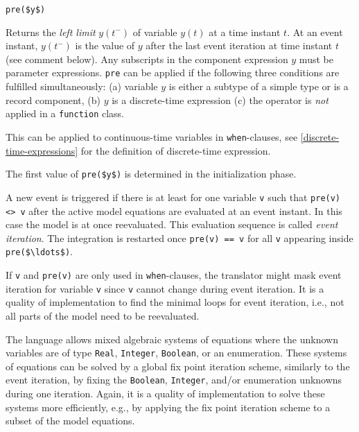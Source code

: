 \begin{operatordefinition}[pre]
\begin{synopsis}\begin{lstlisting}
pre($y$)
\end{lstlisting}\end{synopsis}
\begin{semantics}
Returns the \emph{left limit} $y(t^{-})$ of variable $y(t)$ at a time instant $t$.
At an event instant, $y(t^{-})$ is the value of $y$ after the last event iteration at time instant $t$ (see comment below).
Any subscripts in the component expression $y$ must be parameter expressions.
\lstinline!pre! can be applied if the following three conditions are fulfilled simultaneously: (a) variable $y$ is either a subtype of a simple type or is a record component, (b) $y$ is a discrete-time expression (c) the operator is \emph{not} applied in a \lstinline!function! class.
\begin{nonnormative}
This can be applied to continuous-time variables in \lstinline!when!-clauses, see \cref{discrete-time-expressions} for the definition of discrete-time expression.
\end{nonnormative}
The first value of \lstinline!pre($y$)! is determined in the initialization phase.

A new event is triggered if there is at least for one variable \lstinline!v! such that \lstinline!pre(v) <> v! after the active model equations are evaluated at an event instant.
In this case the model is at once reevaluated.
This evaluation sequence is called \emph{event iteration}.
The integration is restarted once \lstinline!pre(v) == v! for all \lstinline!v! appearing inside \lstinline!pre($\ldots$)!.

\begin{nonnormative}
If \lstinline!v! and \lstinline!pre(v)! are only used in \lstinline!when!-clauses, the translator might mask event iteration for variable \lstinline!v! since \lstinline!v! cannot change during event iteration.
It is a quality of implementation to find the minimal loops for event iteration, i.e., not all parts of the model need to be reevaluated.

The language allows mixed algebraic systems of equations where the unknown variables are of type \lstinline!Real!, \lstinline!Integer!, \lstinline!Boolean!, or an enumeration.
These systems of equations can be solved by a global fix point iteration scheme, similarly to the event iteration, by fixing the \lstinline!Boolean!, \lstinline!Integer!, and/or enumeration unknowns during one iteration.
Again, it is a quality of implementation to solve these systems more efficiently, e.g., by applying the fix point iteration scheme to a subset of the model equations.
\end{nonnormative}
\end{semantics}
\end{operatordefinition}


